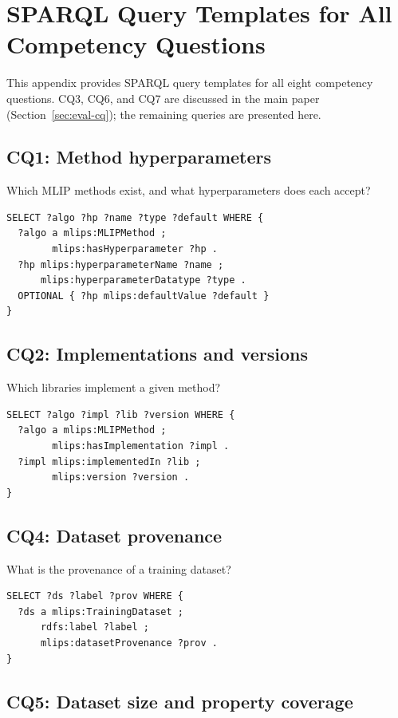 \section{SPARQL Query Templates for All Competency Questions}
\label{sec:appendix-sparql}

This appendix provides SPARQL query templates for all eight competency
questions. CQ3, CQ6, and CQ7 are discussed in the main paper
(Section~\ref{sec:eval-cq}); the remaining queries are presented here.

\subsection{CQ1: Method hyperparameters}

Which MLIP methods exist, and what hyperparameters does each accept?
\begin{lstlisting}[language=sparql]
SELECT ?algo ?hp ?name ?type ?default WHERE {
  ?algo a mlips:MLIPMethod ;
        mlips:hasHyperparameter ?hp .
  ?hp mlips:hyperparameterName ?name ;
      mlips:hyperparameterDatatype ?type .
  OPTIONAL { ?hp mlips:defaultValue ?default }
}
\end{lstlisting}

\subsection{CQ2: Implementations and versions}

Which libraries implement a given method?
\begin{lstlisting}[language=sparql]
SELECT ?algo ?impl ?lib ?version WHERE {
  ?algo a mlips:MLIPMethod ;
        mlips:hasImplementation ?impl .
  ?impl mlips:implementedIn ?lib ;
        mlips:version ?version .
}
\end{lstlisting}

\subsection{CQ4: Dataset provenance}

What is the provenance of a training dataset?
\begin{lstlisting}[language=sparql]
SELECT ?ds ?label ?prov WHERE {
  ?ds a mlips:TrainingDataset ;
      rdfs:label ?label ;
      mlips:datasetProvenance ?prov .
}
\end{lstlisting}

\subsection{CQ5: Dataset size and property coverage}

